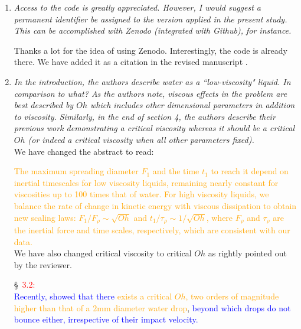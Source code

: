 \documentclass[]{article}
\newcommand*\blue{\textcolor{blue}}
\newcommand*\red{\textcolor{red}}
\newcommand{\VS}[1]{{\textcolor{orange}{#1}}}
\begin{document}
\begin{enumerate}
	
	\item \textit{Access to the code is greatly appreciated. However, I would suggest a permanent identifier be assigned to the version applied in the present study. This can be accomplished with Zenodo (integrated with Github), for instance.}
	
	Thanks a lot for the idea of using Zenodo. Interestingly, the code is already there. We have added it as a citation in the revised manuscript \citep{vatsal_sanjay_2023_7598181}.
	
	
	\item \textit{In the introduction, the authors describe water as a ``low-viscosity" liquid. In comparison to what? As the authors note, viscous effects in the problem are best described by $Oh$ which includes other dimensional parameters in addition to viscosity. Similarly, in the end of section 4, the authors describe their previous work demonstrating a critical viscosity whereas it should be a critical $Oh$ (or indeed a critical viscosity when all other parameters fixed).}\\[0.5mm]
	
	We have changed the abstract to read:
	
	\VS{The maximum spreading diameter $F_1$ and the time $t_1$ to reach it depend on inertial timescales for low viscosity liquids, remaining nearly constant for viscosities up to 100 times that of water. For high viscosity liquids, we balance the rate of change in kinetic energy with viscous dissipation to obtain new scaling laws: $F_1/F_\rho \sim \sqrt{Oh}$ and $t_1/\tau_\rho \sim 1/\sqrt{Oh}$,
	where $F_\rho$ and $\tau_\rho$ are the inertial force and time scales, respectively, which are consistent with our data.}\\[0.5mm]
	
	We have also changed critical viscosity to critical $Oh$ as rightly pointed out by the reviewer.
	
	\S~\red{3.2:}\\
	\blue{Recently, \citet{Jha2020, sanjay_chantelot_lohse_2023} showed that there} \VS{exists a critical $Oh$, two orders of magnitude higher than that of a $2\si{\milli\meter}$ diameter water drop}, \blue{beyond which drops do not bounce either, irrespective of their impact velocity.}
\end{enumerate}
\end{document}
